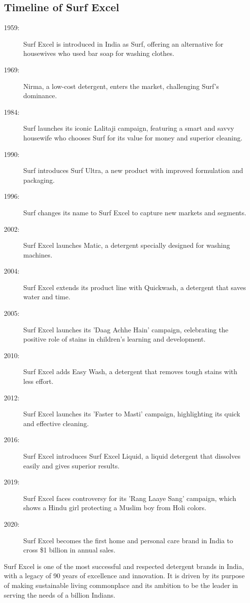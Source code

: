 \subsection{Timeline of Surf Excel}
\begin{description}
  \item[1959:] Surf Excel is introduced in India as Surf, offering an alternative for housewives who used bar soap for washing clothes.
  
  \item[1969:] Nirma, a low-cost detergent, enters the market, challenging Surf's dominance.
  
  \item[1984:] Surf launches its iconic Lalitaji campaign, featuring a smart and savvy housewife who chooses Surf for its value for money and superior cleaning.
  
  \item[1990:] Surf introduces Surf Ultra, a new product with improved formulation and packaging.
  
  \item[1996:] Surf changes its name to Surf Excel to capture new markets and segments.
  
  \item[2002:] Surf Excel launches Matic, a detergent specially designed for washing machines.
  
  \item[2004:] Surf Excel extends its product line with Quickwash, a detergent that saves water and time.
  
  \item[2005:] Surf Excel launches its 'Daag Achhe Hain' campaign, celebrating the positive role of stains in children's learning and development.
  
  \item[2010:] Surf Excel adds Easy Wash, a detergent that removes tough stains with less effort.
  
  \item[2012:] Surf Excel launches its 'Faster to Masti' campaign, highlighting its quick and effective cleaning.
  
  \item[2016:] Surf Excel introduces Surf Excel Liquid, a liquid detergent that dissolves easily and gives superior results.
  
  \item[2019:] Surf Excel faces controversy for its 'Rang Laaye Sang' campaign, which shows a Hindu girl protecting a Muslim boy from Holi colors.
  
  \item[2020:] Surf Excel becomes the first home and personal care brand in India to cross \$1 billion in annual sales.
\end{description}

Surf Excel is one of the most successful and respected detergent brands in India, with a legacy of 90 years of excellence and innovation. It is driven by its purpose of making sustainable living commonplace and its ambition to be the leader in serving the needs of a billion Indians.
